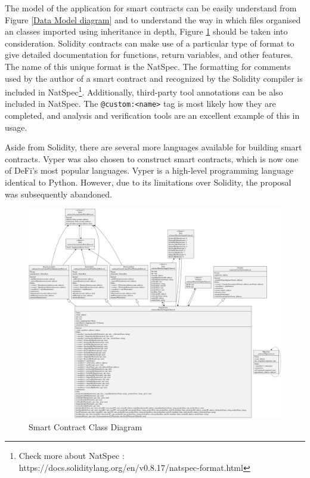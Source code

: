 \vspace{.5cm}

The model of the application for smart contracts can be easily understand from Figure \ref{Data Model diagram} and to understand the way in which files organised an classes imported using inheritance in depth, Figure \ref{Overall Class Diagram} should be taken into consideration. Solidity contracts can make use of a particular type of format to give detailed documentation for functions, return variables, and other features. The name of this unique format is the \ac{NatSpec}. The formatting for comments used by the author of a smart contract and recognized by the Solidity compiler is included in \ac{NatSpec}\footnote{Check more about NatSpec : https://docs.soliditylang.org/en/v0.8.17/natspec-format.html}. Additionally, third-party tool annotations can be also included in \ac{NatSpec}. The \texttt{@custom:<name>} tag is most likely how they are completed, and analysis and verification tools are an excellent example of this in usage.

\vspace{.5cm}

Aside from Solidity, there are several more languages available for building smart contracts. Vyper was also chosen to construct smart contracts, which is now one of \ac{DeFi}'s most popular languages. Vyper is a high-level programming language identical to Python. However, due to its limitations over Solidity, the proposal was subsequently abandoned.


\begin{figure}[!h]
\centering
  \includegraphics[width=21cm, angle=90]{includes/figures/OverallClassDiagram.png} 
  \caption{Smart Contract Class Diagram}
  \label{Overall Class Diagram}
\end{figure}


